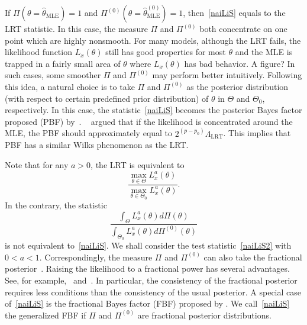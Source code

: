 \documentclass[11pt]{article}
\theoremstyle{plain}
\theoremstyle{definition}
\theoremstyle{remark}
\begin{document}
If $\Pi(\theta=\hat{\theta}_{\text{MLE}})=1$ and $\Pi^{(0)}(\theta=\hat{\theta}^{(0)}_{\text{MLE}})=1$, then~\eqref{naiLiS} equals to the LRT statistic.
In this case, the measure $\Pi$ and $\Pi^{(0)}$ both concentrate on one point which are highly nonsmooth.
For many models, although the LRT fails, the likelihood function $L_x(\theta)$ still has good properties for most $\theta$ and  the MLE is trapped in a fairly small area of $\theta$ where $L_x(\theta)$ has bad behavior.
{\color{red} A figure?}
In such cases, some smoother $\Pi$ and $\Pi^{(0)}$ may perform better intuitively.
Following this idea, a natural choice is to take $\Pi$ and $\Pi^{(0)}$ as the posterior distribution (with respect to certain predefined prior distribution) of $\theta$ in $\Theta$ and $\Theta_0$, respectively.
In this case, the statistic~\eqref{naiLiS} becomes the posterior Bayes factor proposed (PBF) by~\cite{Aitkin1991Posterior}.
~\cite{Aitkin1991Posterior} argued that if the likelihood is concentrated around the MLE, the PBF should approximately equal to $2^{(p-p_0)}\Lambda_{\text{LRT}}$.
This implies that PBF has a similar Wilks phenomenon as the LRT.



Note that for any $a>0$, the LRT is equivalent to
\begin{equation*}
    \frac{\max_{\theta\in\Theta}L_x^{a}(\theta)}{\max_{\theta\in\Theta_0}L_x^a(\theta)}.
\end{equation*}
In the contrary, the statistic
\begin{equation}\label{naiLiS2}
\frac{\int_{\Theta}L_x^a(\theta) d\Pi(\theta)}{\int_{\Theta_0} L_x^a(\theta) d\Pi^{(0)}(\theta)}
\end{equation}
is not equivalent to~\eqref{naiLiS}.
We shall consider the test statistic~\eqref{naiLiS2} with $0<a<1$.
Correspondingly, the measure $\Pi$ and $\Pi^{(0)}$ can also take the fractional posterior~\cite{Bha2016}.
Raising the likelihood to a fractional power has several advantages. See, for example,~\cite{kar10563} and~\cite{Bha2016}.
In particular, the consistency of the fractional posterior requires less conditions than the consistency of the usual posterior.
A special case of~\eqref{naiLiS} is the fractional Bayes factor (FBF) proposed by \cite{Fractional1995}.
We call~\eqref{naiLiS} the generalized FBF if $\Pi$ and $\Pi^{(0)}$ are fractional posterior distributions.
\end{document}
